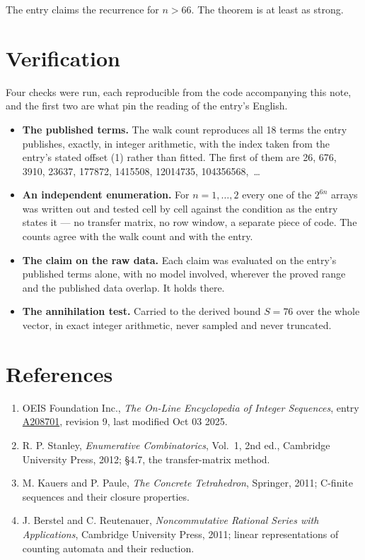 \documentclass[11pt]{article}
\theoremstyle{definition}
\begin{document}
The entry claims the recurrence for $n > 66$. The theorem is at least as strong.

\section{Verification}

Four checks were run, each reproducible from the code accompanying this note, and the first two are what pin the reading of the entry's English.

\begin{itemize}

\item {\bfseries The published terms.} The walk count reproduces all 18 terms the entry publishes, exactly, in integer arithmetic, with the index taken from the entry's stated offset (1) rather than fitted. The first of them are 26, 676, 3910, 23637, 177872, 1415508, 12014735, 104356568,~\dots

\item {\bfseries An independent enumeration.} For $n = 1,\dots,2$ every one of the $2^{6n}$ arrays was written out and tested cell by cell against the condition as the entry states it --- no transfer matrix, no row window, a separate piece of code. The counts agree with the walk count and with the entry.

\item {\bfseries The claim on the raw data.} Each claim was evaluated on the entry's published terms alone, with no model involved, wherever the proved range and the published data overlap. It holds there.

\item {\bfseries The annihilation test.} Carried to the derived bound $S = 76$ over the whole vector, in exact integer arithmetic, never sampled and never truncated.

\end{itemize}

\section{References}

\begin{enumerate}

\item OEIS Foundation Inc., \emph{The On-Line Encyclopedia of Integer Sequences}, entry \href{https://oeis.org/A208701}{A208701}, revision 9, last modified Oct 03 2025.

\item R. P. Stanley, \emph{Enumerative Combinatorics}, Vol.~1, 2nd ed., Cambridge University Press, 2012; \S4.7, the transfer-matrix method.

\item M. Kauers and P. Paule, \emph{The Concrete Tetrahedron}, Springer, 2011; C-finite sequences and their closure properties.

\item J. Berstel and C. Reutenauer, \emph{Noncommutative Rational Series with Applications}, Cambridge University Press, 2011; linear representations of counting automata and their reduction.

\end{enumerate}
\end{document}
